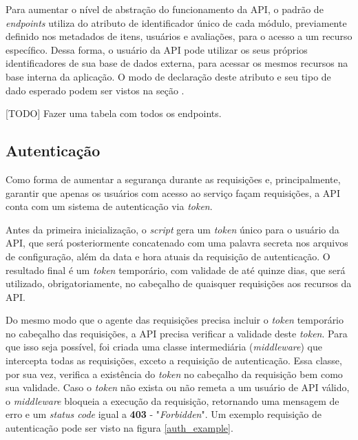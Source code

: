 \documentclass[12pt, openright, oneside, a4paper, brazil]{abntex2}
\begin{document}
Para aumentar o nível de abstração do funcionamento da API, o padrão de \textit{endpoints} utiliza do atributo de identificador único de cada módulo, previamente definido nos metadados de itens, usuários e avaliações, para o acesso a um recurso específico. Dessa forma, o usuário da API pode utilizar os seus próprios identificadores de sua base de dados externa, para acessar os mesmos recursos na base interna da aplicação. O modo de declaração deste atributo e seu tipo de dado esperado podem ser vistos na seção . 

[TODO] Fazer uma tabela com todos os endpoints.

\subsection{Autenticação} \label{autenticacao}

Como forma de aumentar a segurança durante as requisições e, principalmente, garantir que apenas os usuários com acesso ao serviço façam requisições, a API conta com um sistema de autenticação via \textit{token}.

Antes da primeira inicialização, o \textit{script} gera um \textit{token} único para o usuário da API, que será posteriormente concatenado com uma palavra secreta nos arquivos de configuração, além da data e hora atuais da requisição de autenticação. O resultado final é um \textit{token} temporário, com validade de até quinze dias, que será utilizado, obrigatoriamente, no cabeçalho de quaisquer requisições aos recursos da API.

Do mesmo modo que o agente das requisições precisa incluir o \textit{token} temporário no cabeçalho das requisições, a API precisa verificar a validade deste \textit{token}. Para que isso seja possível, foi criada uma classe intermediária (\textit{middleware}) que intercepta todas as requisições, exceto a requisição de autenticação. Essa classe, por sua vez, verifica a existência do \textit{token} no cabeçalho da requisição bem como sua validade. Caso o \textit{token} não exista ou não remeta a um usuário de API válido, o \textit{middleware} bloqueia a execução da requisição, retornando uma mensagem de erro e um \textit{status code} igual a \textbf{403} - "\textit{Forbidden}". Um exemplo requisição de autenticação pode ser visto na figura \ref{auth_example}.
\end{document}
